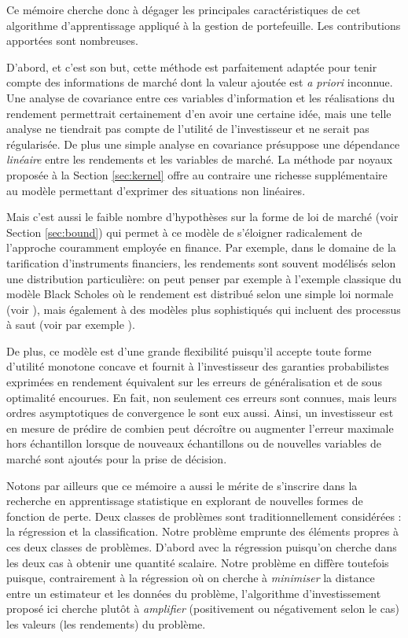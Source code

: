Ce mémoire cherche donc à dégager les principales caractéristiques de cet algorithme
d'apprentissage appliqué à la gestion de portefeuille. Les contributions apportées sont
nombreuses.

D'abord, et c'est son but, cette méthode est parfaitement adaptée pour tenir compte des
informations de marché dont la valeur ajoutée est \textit{a priori} inconnue. Une analyse
de covariance entre ces variables d'information et les réalisations du rendement
permettrait certainement d'en avoir une certaine idée, mais une telle analyse ne tiendrait
pas compte de l'utilité de l'investisseur et ne serait pas régularisée. De plus une simple
analyse en covariance présuppose une dépendance \textit{linéaire} entre les rendements et
les variables de marché. La méthode par noyaux proposée à la Section \ref{sec:kernel}
offre au contraire une richesse supplémentaire au modèle permettant d'exprimer des
situations non linéaires.

Mais c'est aussi le faible nombre d'hypothèses sur la forme de loi de marché (voir Section
\ref{sec:bound}) qui permet à ce modèle de s'éloigner radicalement de l'approche
couramment employée en finance. Par exemple, dans le domaine de la tarification
d'instruments financiers, les rendements sont souvent modélisés selon une distribution
particulière: on peut penser par exemple à l'exemple classique du modèle Black Scholes où
le rendement est distribué selon une simple loi normale (voir
\cite{shreve2004stochastic}), mais également à des modèles plus sophistiqués qui incluent
des processus à saut (voir par exemple \cite{madan1998variance}).

De plus, ce modèle est d'une grande flexibilité puisqu'il accepte toute forme d'utilité
monotone concave et fournit à l'investisseur des garanties probabilistes exprimées en
rendement équivalent sur les erreurs de généralisation et de sous optimalité encourues. En
fait, non seulement ces erreurs sont connues, mais leurs ordres asymptotiques de
convergence le sont eux aussi. Ainsi, un investisseur est en mesure de prédire de combien
peut décroître ou augmenter l'erreur maximale hors échantillon lorsque de nouveaux
échantillons ou de nouvelles variables de marché sont ajoutés pour la prise de décision.

Notons par ailleurs que ce mémoire a aussi le mérite de s'inscrire dans la recherche en
apprentissage statistique en explorant de nouvelles formes de fonction de perte. Deux
classes de problèmes sont traditionnellement considérées : la régression et la
classification. Notre problème emprunte des éléments propres à ces deux classes de
problèmes. D'abord avec la régression puisqu'on cherche dans les deux cas à obtenir une
quantité scalaire. Notre problème en diffère toutefois puisque, contrairement à la
régression où on cherche à \textit{minimiser} la distance entre un estimateur et les
données du problème, l'algorithme d'investissement proposé ici cherche plutôt à
\textit{amplifier} (positivement ou négativement selon le cas) les valeurs (les
rendements) du problème.

